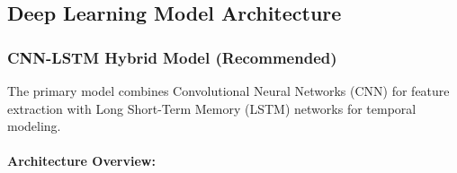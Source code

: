 \documentclass[12pt,a4paper]{article}
\begin{document}
\subsection{Deep Learning Model Architecture}

\subsubsection{CNN-LSTM Hybrid Model (Recommended)}

The primary model combines Convolutional Neural Networks (CNN) for feature extraction with Long Short-Term Memory (LSTM) networks for temporal modeling.

\paragraph{Architecture Overview:}
\end{document}
